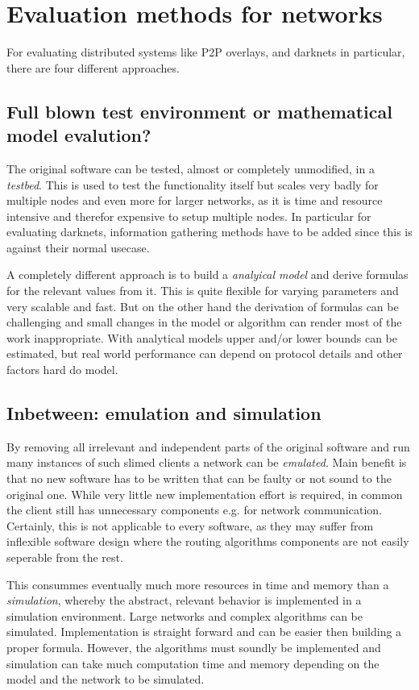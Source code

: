 \section{Evaluation methods for networks}

For evaluating distributed systems like P2P overlays, and darknets in particular, there are four different approaches. 

\subsection{Full blown test environment or mathematical model evalution?}

The original software can be tested, almost or completely unmodified, in a \emph{testbed}. This is used to test the functionality itself but scales very badly for multiple nodes and even more for larger networks, as it is time and resource intensive and therefor expensive to setup multiple nodes. In particular for evaluating darknets, information gathering methods have to be added since this is against their normal usecase.

A completely different approach is to build a \emph{analyical model} and derive formulas for the relevant values from it. This is quite flexible for varying parameters and very scalable and fast. But on the other hand the derivation of formulas can be challenging and small changes in the model or algorithm can render most of the work inappropriate. With analytical models upper and/or lower bounds can be estimated, but real world performance can depend on protocol details and other factors hard do model.

\subsection{Inbetween: emulation and simulation}

By removing all irrelevant and independent parts of the original software and run many instances of such slimed clients a network can be \emph{emulated}. Main benefit is that no new software has to be written that can be faulty or not sound to the original one. While very little new implementation effort is required, in common the client still has unnecessary components e.g. for network communication. Certainly, this is not applicable to every software, as they may suffer from inflexible software design where the routing algorithms components are not easily seperable from the rest.

This consummes eventually much more resources in time and memory than a \emph{simulation}, whereby the abstract, relevant behavior is implemented in a simulation environment. Large networks and complex algorithms can be simulated. Implementation is straight forward and can be easier then building a proper formula. However, the algorithms must soundly be implemented and simulation can take much computation time and memory depending on the model and the network to be simulated.


